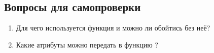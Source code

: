 \subsection{Вопросы для самопроверки}
\begin{enumerate}
    \item Для чего используется функция  и можно ли обойтись без неё?
    \item Какие атрибуты можно передать в функцию ?
\end{enumerate}
